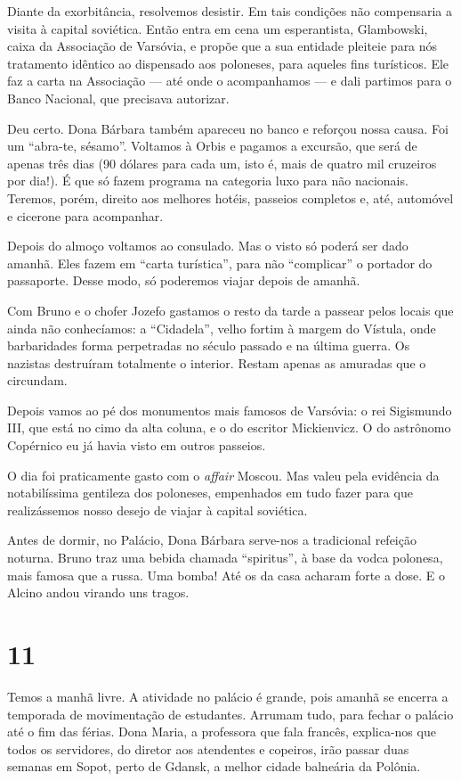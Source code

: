 Diante da exorbitância, resolvemos desistir. Em tais condições não compensaria a visita à capital soviética. Então entra em cena um esperantista, Glambowski, caixa da Associação de Varsóvia, e propõe que a sua entidade pleiteie para nós tratamento idêntico ao dispensado aos poloneses, para aqueles fins turísticos. Ele faz a carta na Associação --- até onde o acompanhamos --- e dali partimos para o Banco Nacional, que precisava autorizar.

Deu certo. Dona Bárbara também apareceu no banco e reforçou nossa causa. Foi um ``abra-te, sésamo''. Voltamos à Orbis e pagamos a excursão, que será de apenas três dias (90 dólares para cada um, isto é, mais de quatro mil cruzeiros por dia!). É que só fazem programa na categoria luxo para não nacionais. Teremos, porém, direito aos melhores hotéis, passeios completos e, até, automóvel e cicerone para acompanhar.

Depois do almoço voltamos ao consulado. Mas o visto só poderá ser dado amanhã. Eles fazem em ``carta turística'', para não ``complicar'' o portador do passaporte. Desse modo, só poderemos viajar depois de amanhã.

Com Bruno e o chofer Jozefo gastamos o resto da tarde a passear pelos locais que ainda não conhecíamos: a ``Cidadela'', velho fortim à margem do Vístula, onde barbaridades forma perpetradas no século passado e na última guerra. Os nazistas destruíram totalmente o interior. Restam apenas as amuradas que o circundam.

Depois vamos ao pé dos monumentos mais famosos de Varsóvia: o rei Sigismundo III, que está no cimo da alta coluna, e o do escritor Mickienvicz. O do astrônomo Copérnico eu já havia visto em outros passeios.

O dia foi praticamente gasto com o \textit{affair} Moscou. Mas valeu pela evidência da notabilíssima gentileza dos poloneses, empenhados em tudo fazer para que realizássemos nosso desejo de viajar à capital soviética.

Antes de dormir, no Palácio, Dona Bárbara serve-nos a tradicional refeição noturna. Bruno traz uma bebida chamada ``spiritus'', à base da vodca polonesa, mais famosa que a russa. Uma bomba! Até os da casa acharam forte a dose. E o Alcino andou virando uns tragos.

\section*{11 \adfflatleafright {}}
Temos a manhã livre. A atividade no palácio é grande, pois amanhã se encerra a temporada de movimentação de estudantes. Arrumam tudo, para fechar o palácio até o fim das férias. Dona Maria, a professora que fala francês, explica-nos que todos os servidores, do diretor aos atendentes e copeiros, irão passar duas semanas em Sopot, perto de Gdansk, a melhor cidade balneária da Polônia.

